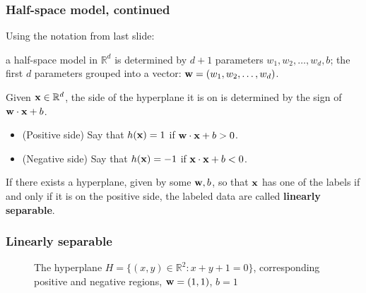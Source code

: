 \documentclass{beamer}
\theoremstyle{example}
\begin{document}
\begin{frame}
\frametitle{Half-space model, continued}
    Using the notation from last slide: 
    
    a half-space model in $\mathbb R^d$ is determined by $d+1$ parameters $w_1,w_2,\ldots,w_d,b$; the first $d$ parameters grouped into a vector: ${\bf w} = (w_1,w_2,\ldots,w_d)$.
    
    \pause
    Given ${\bf x}\in \mathbb R^d$, the side of the hyperplane it is on is determined by the sign of ${\bf w}\cdot{\bf x} + b$.
    \begin{itemize}
        \item (Positive side) Say that $h({\bf x}) = 1$ if ${\bf w}\cdot{\bf x}+b > 0$.
        \item (Negative side) Say that $h({\bf x}) = -1$ if ${\bf x}\cdot{\bf x}+b < 0$. 
    \end{itemize}

    \pause
    If there exists a hyperplane, given by some ${\bf w}, b$, so that ${\bf x}$ has one of the labels if and only if it is on the positive side, the labeled data are called \textbf{linearly separable}. 

\end{frame}

\begin{frame}
    \frametitle{Linearly separable}
    \begin{figure}[h!]
        \centering
        \caption{The hyperplane $H = \{(x,y)\in \mathbb R^2: x+ y+ 1 = 0\}$, corresponding positive and negative regions, ${\bf w} = (1, 1)$, $b = 1$}
        \label{figure:R2HyperplaneLabeled}
    \end{figure}
\end{frame}
\end{document}
